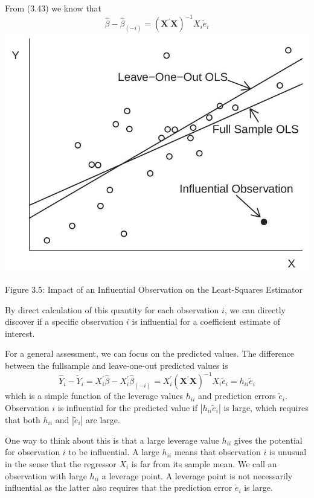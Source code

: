 \documentclass[10pt]{article}
\begin{document}
From (3.43) we know that
$$
\widehat{\beta}-\widehat{\beta}_{(-i)}=\left(\boldsymbol{X}^{\prime} \boldsymbol{X}\right)^{-1} X_{i} \widetilde{e}_{i}
$$
\includegraphics[max width=\textwidth]{2022_09_17_333a3ece3fb3afcc15d0g-25}

Figure 3.5: Impact of an Influential Observation on the Least-Squares Estimator

By direct calculation of this quantity for each observation $i$, we can directly discover if a specific observation $i$ is influential for a coefficient estimate of interest.

For a general assessment, we can focus on the predicted values. The difference between the fullsample and leave-one-out predicted values is
$$
\widehat{Y}_{i}-\widetilde{Y}_{i}=X_{i}^{\prime} \widehat{\beta}-X_{i}^{\prime} \widehat{\beta}_{(-i)}=X_{i}^{\prime}\left(\boldsymbol{X}^{\prime} \boldsymbol{X}\right)^{-1} X_{i} \widetilde{e}_{i}=h_{i i} \widetilde{e}_{i}
$$
which is a simple function of the leverage values $h_{i i}$ and prediction errors $\widetilde{e}_{i}$. Observation $i$ is influential for the predicted value if $\left|h_{i i} \widetilde{e}_{i}\right|$ is large, which requires that both $h_{i i}$ and $\left|\widetilde{e}_{i}\right|$ are large.

One way to think about this is that a large leverage value $h_{i i}$ gives the potential for observation $i$ to be influential. A large $h_{i i}$ means that observation $i$ is unusual in the sense that the regressor $X_{i}$ is far from its sample mean. We call an observation with large $h_{i i}$ a leverage point. A leverage point is not necessarily influential as the latter also requires that the prediction error $\widetilde{e}_{i}$ is large.
\end{document}
